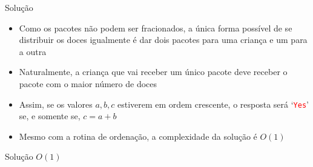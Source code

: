 \begin{frame}[fragile]{Solução}

    \begin{itemize}
        \item Como os pacotes não podem ser fracionados, a única forma possível de se 
            distribuir os doces igualmente é dar dois pacotes para uma criança e um para 
            a outra

        \item Naturalmente, a criança que vai receber um único pacote deve receber o pacote
            com o maior número de doces

        \item Assim, se os valores $a, b, c$ estiverem em ordem crescente, o resposta será
            `\texttt{\textcolor{red}{Yes}}' se, e somente se, $c = a + b$

        \item Mesmo com a rotina de ordenação, a complexidade da solução é $O(1)$

    \end{itemize}

\end{frame}

\begin{frame}[fragile]{Solução $O(1)$}
\end{frame}
